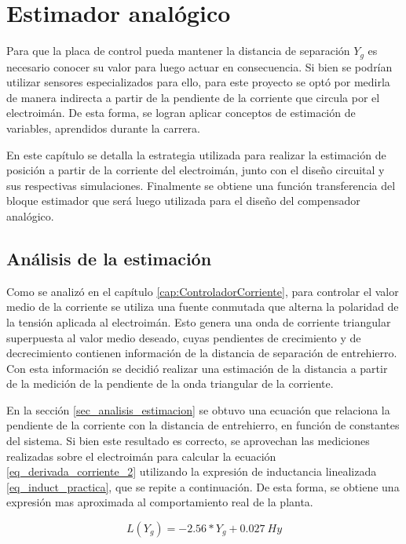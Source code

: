 \chapter{Estimador analógico}  \label{cap:Estimador Analogico}

Para que la placa de control pueda mantener la distancia de separación $Y_{g}$ es necesario conocer su valor para luego actuar en consecuencia. Si bien se podrían utilizar sensores  especializados para ello, para este proyecto se optó por medirla de manera indirecta a partir de la pendiente de la corriente que circula por el electroimán. De esta forma, se logran aplicar conceptos de estimación de variables, aprendidos durante la carrera. 

En este capítulo se detalla la estrategia utilizada para realizar la estimación de posición a partir de la corriente del electroimán, junto con el diseño circuital y sus respectivas simulaciones. Finalmente se obtiene una función transferencia del bloque estimador que será luego utilizada para el diseño del compensador analógico.

\section{Análisis de la estimación}

Como se analizó en el capítulo \ref{cap:ControladorCorriente}, para controlar el valor medio de la corriente se utiliza una fuente conmutada que alterna la polaridad de la tensión aplicada al electroimán. Esto genera una onda de corriente triangular superpuesta al valor medio deseado, cuyas pendientes de crecimiento y de decrecimiento contienen información de la distancia de separación de entrehierro. Con esta información se decidió realizar una estimación de la distancia a partir de la medición de la pendiente de la onda triangular de la corriente.

En la sección \ref{sec_analisis_estimacion} se obtuvo una ecuación que relaciona la pendiente de la corriente con la distancia de entrehierro, en función de constantes del sistema. Si bien este resultado es correcto, se aprovechan las mediciones realizadas sobre el electroimán para calcular la ecuación \ref{eq_derivada_corriente_2} utilizando la expresión de inductancia linealizada \ref{eq_induct_practica}, que se repite a continuación. De esta forma, se obtiene una expresión mas aproximada al comportamiento real de la planta.

\begin{equation*}
	L(Y_g)=-2.56*Y_{g}+0.027\:Hy
\end{equation*}

